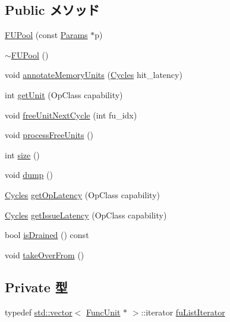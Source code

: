 \subsection*{Public メソッド}
\begin{DoxyCompactItemize}
\item 
\hyperlink{classFUPool_aba08c56e41f112e5044ca90734506bef}{FUPool} (const \hyperlink{classFUPool_a9d3633c4c2cf6388d3099abc3b5c8eb2}{Params} $\ast$p)
\item 
\hyperlink{classFUPool_acab5c3e76b336f001a3d89b08394f0f9}{$\sim$FUPool} ()
\item 
void \hyperlink{classFUPool_a59e607411e1d22642856849eff50ea12}{annotateMemoryUnits} (\hyperlink{classCycles}{Cycles} hit\_\-latency)
\item 
int \hyperlink{classFUPool_afe4fb1c0e25607723658c1051ff3b0bf}{getUnit} (OpClass capability)
\item 
void \hyperlink{classFUPool_acc1a8526665e1f0cc2c346754ab30f4f}{freeUnitNextCycle} (int fu\_\-idx)
\item 
void \hyperlink{classFUPool_a1bcdcf502cf9d45b221bd0ddfd98e1dc}{processFreeUnits} ()
\item 
int \hyperlink{classFUPool_af4b57d21919c42d55af03391f91a1c08}{size} ()
\item 
void \hyperlink{classFUPool_accd2600060dbaee3a3b41aed4034c63c}{dump} ()
\item 
\hyperlink{classCycles}{Cycles} \hyperlink{classFUPool_af6d130ca8a17818dbea697b65927e9ec}{getOpLatency} (OpClass capability)
\item 
\hyperlink{classCycles}{Cycles} \hyperlink{classFUPool_a99e4f990eca3fd57c7728cfdb6c95b4c}{getIssueLatency} (OpClass capability)
\item 
bool \hyperlink{classFUPool_adf5473c18a3d7c1e88c4a2072bce5526}{isDrained} () const 
\item 
void \hyperlink{classFUPool_a8674059ce345e23aac5086b2c3e24a43}{takeOverFrom} ()
\end{DoxyCompactItemize}
\subsection*{Private 型}
\begin{DoxyCompactItemize}
\item 
typedef \hyperlink{classstd_1_1vector}{std::vector}$<$ \hyperlink{classFuncUnit}{FuncUnit} $\ast$ $>$::iterator \hyperlink{classFUPool_a3e016eb9543b88309e1309f75f1c388c}{fuListIterator}
\end{DoxyCompactItemize}
